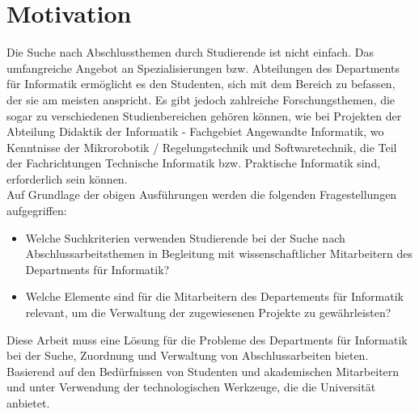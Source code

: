 \section{Motivation}
Die Suche nach Abschlussthemen durch Studierende ist nicht einfach.  Das umfangreiche Angebot an Spezialisierungen bzw. Abteilungen des Departments für Informatik ermöglicht es den Studenten, sich mit dem Bereich zu befassen, der sie am meisten anspricht. Es gibt jedoch zahlreiche Forschungsthemen, die sogar zu verschiedenen Studienbereichen gehören können, wie bei Projekten der Abteilung Didaktik der Informatik - Fachgebiet Angewandte Informatik, wo Kenntnisse der Mikrorobotik / Regelungstechnik und Softwaretechnik, die Teil der Fachrichtungen Technische Informatik bzw. Praktische Informatik sind, erforderlich sein können.\\

Auf Grundlage der obigen Ausführungen werden die folgenden Fragestellungen aufgegriffen:

\begin{itemize}
	\item Welche Suchkriterien verwenden Studierende bei der Suche nach Abschlussarbeitsthemen in Begleitung mit wissenschaftlicher Mitarbeitern des Departments für Informatik?
	
	\item Welche Elemente sind für die Mitarbeitern des Departements für Informatik relevant, um die Verwaltung der zugewiesenen Projekte zu gewährleisten?
\end{itemize}

Diese Arbeit muss eine Lösung für die Probleme des Departments für Informatik bei der Suche, Zuordnung und Verwaltung von Abschlussarbeiten bieten. Basierend auf den Bedürfnissen von Studenten und akademischen Mitarbeitern und unter Verwendung der technologischen Werkzeuge, die die Universität anbietet.
